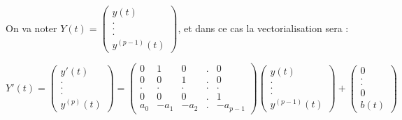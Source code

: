 \documentclass[a4paper,12pt]{book}
\newcommand{\Prop}[2]{\begin{tcolorbox}[sharp corners, colback=white,colframe=red!90!black!75, title=Proposition : #1]#2\end{tcolorbox}}
\begin{document}
\Prop{Traduction matricielle}{On va noter $Y(t) = \begin{pmatrix} y(t) \\ . \\. \\.\\ y^{(p-1)}(t)\end{pmatrix}$, et dans ce cas la vectorialisation sera :
\par $$Y'(t) = \begin{pmatrix}y'(t)\\.\\.\\.\\y^{(p)}(t)\end{pmatrix} = \begin{pmatrix} 0 & 1 & 0 & . & 0 \\ 0 & 0 & 1 & . & 0 \\.&.&.&.&. \\ 0 & 0 & 0 & . & 1 \\ a_0 & -a_1 & -a_2 & . & -a_{p-1}\end{pmatrix}\begin{pmatrix} y(t)\\.\\.\\.\\ y^{(p-1)}(t)\end{pmatrix} +\begin{pmatrix}0 \\.\\.\\0\\b(t) \end{pmatrix}$$}
\end{document}
